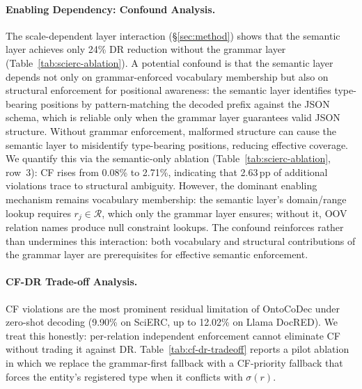 
\paragraph{Enabling Dependency: Confound Analysis.}
\label{app:enabling-confound}

The scale-dependent layer interaction (\S\ref{sec:method}) shows that the semantic layer achieves only 24\% DR reduction without the grammar layer (Table~\ref{tab:scierc-ablation}).
A potential confound is that the semantic layer depends not only on grammar-enforced vocabulary membership but also on structural enforcement for positional awareness: the semantic layer identifies type-bearing positions by pattern-matching the decoded prefix against the JSON schema, which is reliable only when the grammar layer guarantees valid JSON structure.
Without grammar enforcement, malformed structure can cause the semantic layer to misidentify type-bearing positions, reducing effective coverage.
We quantify this via the semantic-only ablation (Table~\ref{tab:scierc-ablation}, row~3): CF rises from 0.08\% to 2.71\%, indicating that 2.63\,pp of additional violations trace to structural ambiguity.
However, the dominant enabling mechanism remains vocabulary membership: the semantic layer's domain/range lookup requires $r_j \in \mathcal{R}$, which only the grammar layer ensures; without it, OOV relation names produce null constraint lookups.
The confound reinforces rather than undermines this interaction: both vocabulary and structural contributions of the grammar layer are prerequisites for effective semantic enforcement.


\paragraph{CF-DR Trade-off Analysis.}
\label{app:cf-dr-tradeoff}

CF violations are the most prominent residual limitation of OntoCoDec under zero-shot decoding (9.90\% on SciERC, up to 12.02\% on Llama DocRED).
We treat this honestly: per-relation independent enforcement cannot eliminate CF without trading it against DR.
Table~\ref{tab:cf-dr-tradeoff} reports a pilot ablation in which we replace the grammar-first fallback with a CF-priority fallback that forces the entity's registered type when it conflicts with $\sigma(r)$.

